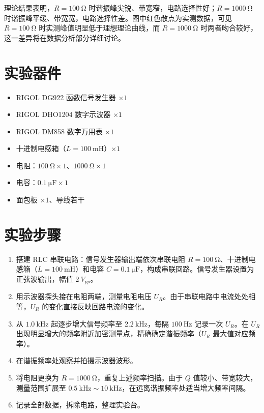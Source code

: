 理论结果表明，\(R=\SI{100}{\ohm}\) 时谐振峰尖锐、带宽窄，电路选择性好；\(R=\SI{1000}{\ohm}\) 时谐振峰平缓、带宽宽，电路选择性差。图中红色散点为实测数据，可见 \(R=\SI{100}{\ohm}\) 时实测峰值明显低于理想理论曲线，而 \(R=\SI{1000}{\ohm}\) 时两者吻合较好，这一差异将在数据分析部分详细讨论。

\section{实验器件}

\begin{itemize}
    \item RIGOL DG922 函数信号发生器 \(\times 1\)
    \item RIGOL DHO1204 数字示波器 \(\times 1\)
    \item RIGOL DM858 数字万用表 \(\times 1\)
    \item 十进制电感箱（\(L=\SI{100}{\milli\henry}\)）\(\times 1\)
    \item 电阻：\(\SI{100}{\ohm}\times 1\)、\(\SI{1000}{\ohm}\times 1\)
    \item 电容：\(\SI{0.1}{\micro\farad}\times 1\)
    \item 面包板 \(\times 1\)、导线若干
\end{itemize}

\section{实验步骤}

\begin{enumerate}[label=\arabic*.]
    \item 搭建 RLC 串联电路：信号发生器输出端依次串联电阻 \(R=\SI{100}{\ohm}\)、十进制电感箱（\(L=\SI{100}{\milli\henry}\)）和电容 \(C=\SI{0.1}{\micro\farad}\)，构成串联回路。信号发生器设置为正弦波输出，幅值 \(\SI{2}{V_{pp}}\)。
    \item 用示波器探头接在电阻两端，测量电阻电压 \(U_{R}\)。由于串联电路中电流处处相等，\(U_{R}\) 的变化直接反映回路电流的变化。
    \item 从 \(\SI{1.0}{\kilo\hertz}\) 起逐步增大信号频率至 \(\SI{2.2}{\kilo\hertz}\)，每隔 \(\SI{100}{\hertz}\) 记录一次 \(U_{R}\)。在 \(U_{R}\) 出现明显增大的频率附近加密测量点，精确确定谐振频率（\(U_{R}\) 最大值对应频率）。
    \item 在谐振频率处观察并拍摄示波器波形。
    \item 将电阻更换为 \(R=\SI{1000}{\ohm}\)，重复上述频率扫描。由于 \(Q\) 值较小、带宽较大，测量范围扩展至 \(\SI{0.5}{\kilo\hertz}\sim\SI{10}{\kilo\hertz}\)，在远离谐振频率处适当增大频率间隔。
    \item 记录全部数据，拆除电路，整理实验台。
\end{enumerate}

